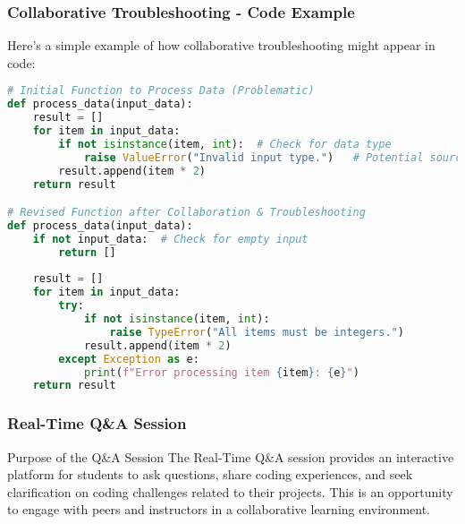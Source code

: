 \documentclass[aspectratio=169]{beamer}
\begin{document}
\begin{frame}[fragile]
    \frametitle{Collaborative Troubleshooting - Code Example}
    Here’s a simple example of how collaborative troubleshooting might appear in code:

    \begin{lstlisting}[language=Python]
# Initial Function to Process Data (Problematic)
def process_data(input_data):
    result = []
    for item in input_data:
        if not isinstance(item, int):  # Check for data type
            raise ValueError("Invalid input type.")   # Potential source of error
        result.append(item * 2)
    return result

# Revised Function after Collaboration & Troubleshooting
def process_data(input_data):
    if not input_data:  # Check for empty input
        return []
    
    result = []
    for item in input_data:
        try:
            if not isinstance(item, int):
                raise TypeError("All items must be integers.")
            result.append(item * 2)
        except Exception as e:
            print(f"Error processing item {item}: {e}")
    return result
    \end{lstlisting}
\end{frame}

\begin{frame}
    \frametitle{Real-Time Q\&A Session}
    \begin{block}{Purpose of the Q\&A Session}
        The Real-Time Q\&A session provides an interactive platform for students to ask questions, share coding experiences, and seek clarification on coding challenges related to their projects. This is an opportunity to engage with peers and instructors in a collaborative learning environment.
    \end{block}
\end{frame}
\end{document}
